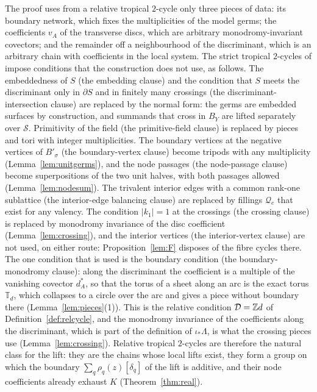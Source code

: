 The proof uses from a relative tropical $2$-cycle only three pieces of data: its boundary network, which fixes the
multiplicities of the model germs; the coefficients $v_A$ of the transverse discs, which are arbitrary monodromy-invariant
covectors; and the remainder off a neighbourhood of the discriminant, which is an arbitrary chain with coefficients in the
local system. The strict tropical $2$-cycles of \cite[Def.~7.2]{CBM} impose conditions that the construction does not use,
as follows. The embeddedness of $S$ (the embedding clause) and the condition that $S$ meets the discriminant only in $\partial S$ and
in finitely many crossings (the discriminant-intersection clause) are replaced by the normal form: the germs are embedded surfaces by construction,
and summands that cross in $B_Y$ are lifted separately over $\mathscr S$. Primitivity of the field (the primitive-field clause) is
replaced by pieces and tori with integer multiplicities. The boundary vertices at the negative vertices of $B'_\sigma$
(the boundary-vertex clause) become tripods with any multiplicity (Lemma~\ref{lem:unitgerms}), and the node passages (the node-passage clause) become
superpositions of the two unit halves, with both passages allowed (Lemma~\ref{lem:nodesum}). The trivalent interior edges
with a common rank-one sublattice (the interior-edge balancing clause) are replaced by fillings $\mathscr Q_e$ that exist for any valency. The condition
$|k_1|=1$ at the crossings (the crossing clause) is replaced by monodromy invariance of the disc coefficient
(Lemma~\ref{lem:crossing}), and the interior vertices (the interior-vertex clause) are not used, on either route: Proposition~\ref{lem:F} disposes
of the fibre cycles there. The one condition that is used is the boundary condition (the boundary-monodromy clause): along the discriminant the
coefficient is a multiple of the vanishing covector $d^*_A$, so that the torus of a sheet along an arc is the exact torus
$\mathbb T_d$, which collapses to a circle over the arc and gives a piece without boundary there
(Lemma~\ref{lem:pieces}(1)). This is the relative condition $\mathcal D=\mathbb Z d$ of Definition~\ref{def:relcycle}, and the
monodromy invariance of the coefficients along the discriminant, which is part of the definition of $\iota_*\Lambda$, is
what the crossing pieces use (Lemma~\ref{lem:crossing}). Relative tropical
$2$-cycles are therefore the natural class for the lift: they are the chains whose local lifts exist, they form a group on
which the boundary $\sum_q\rho_q(z)[\delta_q]$ of the lift is additive, and their node coefficients already exhaust $K$ (Theorem~\ref{thm:real}).

